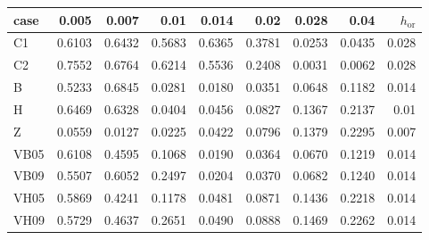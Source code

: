 \begin{tabular}{lrrrrrrrr}
\toprule
case & 0.005 & 0.007 & 0.01 & 0.014 & 0.02 & 0.028 & 0.04 & $h_{\mathrm{or}}$ \\
\midrule
C1 & 0.6103 & 0.6432 & 0.5683 & 0.6365 & 0.3781 & 0.0253 & 0.0435 & 0.028 \\
C2 & 0.7552 & 0.6764 & 0.6214 & 0.5536 & 0.2408 & 0.0031 & 0.0062 & 0.028 \\
B & 0.5233 & 0.6845 & 0.0281 & 0.0180 & 0.0351 & 0.0648 & 0.1182 & 0.014 \\
H & 0.6469 & 0.6328 & 0.0404 & 0.0456 & 0.0827 & 0.1367 & 0.2137 & 0.01 \\
Z & 0.0559 & 0.0127 & 0.0225 & 0.0422 & 0.0796 & 0.1379 & 0.2295 & 0.007 \\
VB05 & 0.6108 & 0.4595 & 0.1068 & 0.0190 & 0.0364 & 0.0670 & 0.1219 & 0.014 \\
VB09 & 0.5507 & 0.6052 & 0.2497 & 0.0204 & 0.0370 & 0.0682 & 0.1240 & 0.014 \\
VH05 & 0.5869 & 0.4241 & 0.1178 & 0.0481 & 0.0871 & 0.1436 & 0.2218 & 0.014 \\
VH09 & 0.5729 & 0.4637 & 0.2651 & 0.0490 & 0.0888 & 0.1469 & 0.2262 & 0.014 \\
\bottomrule
\end{tabular}
